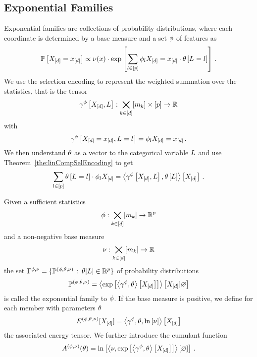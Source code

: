 \subsection{Exponential Families}\label{sec:exponentialFamilies}

Exponential families are collections of probability distributions, where each coordinate is determined by a base measure and a set $\phi$ of features as
	\[ \mathbb{P}\left[X_{[d]}=x_{[d]}\right]  \propto \nu(x) \cdot \mathrm{exp}\left[\sum_{l\in[p]} \phi_{l}{X_{[d]}=x_{[d]}} \cdot \theta\left[L_{}=l_{}\right]\right] \, . \]
We use the selection encoding to represent the weighted summation over the statistics, that is the tensor
	\[ \gamma^{\phi}\left[X_{[d]},L\right]: \bigtimes_{k\in[d]}[m_{k}] \times [p] \rightarrow \mathbb{R} \]
with
	\[ \gamma^{\phi}\left[X_{[d]}=x_{[d]},L_{}=l_{}\right] = \phi_{l}{X_{[d]}=x_{[d]}} \, . \]
We then understand $\theta$ as a vector to the categorical variable $L$ and use Theorem~\ref{the:linCompSelEncoding} to get
	\[ \sum_{l\in[p]}\theta\left[L_{}=l_{}\right]\cdot \phi_{l}{X_{[d]}}
		 = \left\langle \gamma^{\phi}\left[X_{[d]},L\right],\theta\left[L\right]\right\rangle \left[ X_{[d]} \right] \, . \]

\begin{definition}
	Given a sufficient statistics 
		\[ \phi : \bigtimes_{k\in[d]}[m_{k}] \rightarrow \mathbb{R}^p\]
	and a non-negative base measure
		\[ \nu : \bigtimes_{k\in[d]}[m_{k}] \rightarrow \mathbb{R} \]
	the set $\Gamma^{\phi,\nu}=\{\mathbb{P}^{(\phi,\theta,\nu)} \, : \, \theta[L] \in \mathbb{R}^{p}\}$ of probability distributions 
		\[ \mathbb{P}^{(\phi,\theta,\nu)} = \left\langle \mathrm{exp}\left[\left\langle \gamma^{\phi},\theta\right\rangle \left[ X_{[d]} \right]\right]\right\rangle \left[ X_{[d]} | \varnothing \right] \]
	is called the exponential family to $\phi$.
	If the base measure is positive, we define for each member with parameters $\theta$
		\[ E^{(\phi,\theta,\nu)}[X_{[d]}] = \left\langle \gamma^{\phi},\theta,\ln \left[ \nu \right]\right\rangle \left[ X_{[d]} \right] \]
	the associated energy tensor.
	We further introduce the cumulant function
		\[ A^{(\phi,\nu)}(\theta) = \ln \left[ \left\langle \nu,\mathrm{exp}\left[\left\langle \gamma^{\phi},\theta\right\rangle \left[ X_{[d]} \right] \right]\right\rangle \left[ \varnothing \right]  \right] \, .\]
\end{definition}



